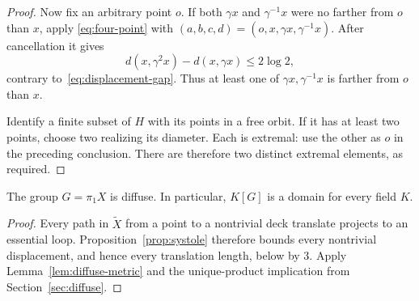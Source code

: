 \begin{proof}
Now fix an arbitrary point \(o\). If both \(\gamma x\) and
\(\gamma^{-1}x\) were no farther from \(o\) than \(x\), apply
\eqref{eq:four-point} with
\((a,b,c,d)=(o,x,\gamma x,\gamma^{-1}x)\).
After cancellation it gives
\[
 d(x,\gamma^2x)-d(x,\gamma x)\le2\log2,
\]
contrary to~\eqref{eq:displacement-gap}.
Thus at least one of \(\gamma x,\gamma^{-1}x\) is farther from
\(o\) than \(x\).

Identify a finite subset of \(H\) with its points in a free orbit.
If it has at least two points, choose two realizing its diameter.
Each is extremal: use the other as \(o\) in the preceding conclusion.
There are therefore two distinct extremal elements, as required.
\end{proof}

\begin{corollary}\label{cor:base-diffuse}
The group \(G=\pi_1X\) is diffuse. In particular, \(K[G]\) is a
domain for every field \(K\).
\end{corollary}

\begin{proof}
Every path in \(\widetilde X\) from a point to a nontrivial deck
translate projects to an essential loop. Proposition~\ref{prop:systole}
therefore bounds every nontrivial displacement, and hence every
translation length, below by \(3\).
Apply Lemma~\ref{lem:diffuse-metric} and the unique-product implication
from Section~\ref{sec:diffuse}.
\end{proof}
